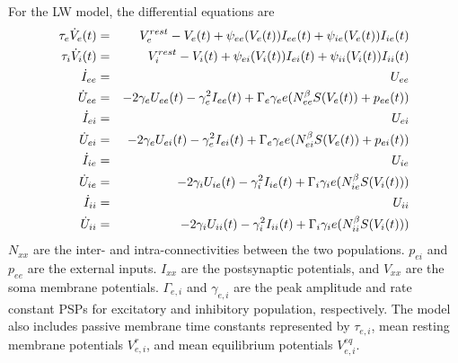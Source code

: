 \documentclass[12pt,twoside]{article}
\begin{document}
For the LW model, the differential equations are
\vspace{-0.3cm}
\begin{eqnarray}
    \tau_{e}\dot{V}_{e}(t) &=& V_{e}^{rest} - V_{e}(t) + \psi_{ee}(V_{e}(t))I_{ee}(t) + \psi_{ie}(V_{e}(t))I_{ie}(t)\\
    \tau_{i}\dot{V}_{i}(t) &=& V_{i}^{rest} - V_{i}(t) + \psi_{ei}(V_{i}(t))I_{ei}(t) + \psi_{ii}(V_{i}(t))I_{ii}(t)\\
    \dot{I}_{ee} &=& U_{ee}\\
    \dot{U}_{ee} &=& -2\gamma_{e}U_{ee}(t) - \gamma_{e}^{2}I_{ee}(t) + \Gamma_{e}\gamma_{e}e(N_{ee}^{\beta}S(V_{e}(t)) + p_{ee}(t))\\
    \dot{I}_{ei} &=& U_{ei}\\
    \dot{U}_{ei} &=& -2\gamma_{e}U_{ei}(t) - \gamma_{e}^{2}I_{ei}(t) + \Gamma_{e}\gamma_{e}e(N_{ei}^{\beta}S(V_{e}(t)) + p_{ei}(t))\\
    \dot{I}_{ie} &=& U_{ie}\\
    \dot{U}_{ie} &=& -2\gamma_{i}U_{ie}(t) - \gamma_{i}^{2}I_{ie}(t) + \Gamma_{i}\gamma_{i}e(N_{ie}^{\beta}S(V_{i}(t)))\\
    \dot{I}_{ii} &=& U_{ii}\\
    \dot{U}_{ii} &=& -2\gamma_{i}U_{ii}(t) - \gamma_{i}^{2}I_{ii}(t) + \Gamma_{i}\gamma_{i}e(N_{ii}^{\beta}S(V_{i}(t)))
    \vspace{-0.4cm}
\end{eqnarray}
$N_{xx}$ are the inter- and intra-connectivities between the two populations. $p_{ei}$ and $p_{ee}$ are the external inputs. $I_{xx}$ are the postsynaptic potentials, and $V_{xx}$ are the soma membrane potentials. $\Gamma_{e,i}$ and $\gamma_{e,i}$ are the peak amplitude and rate constant PSPs for excitatory and inhibitory population, respectively. The model also includes passive membrane time constants represented by $\tau_{e,i}$, mean resting membrane potentials $V^{r}_{e,i}$, and mean equilibrium potentials $V^{eq}_{e,i}$.
\end{document}
